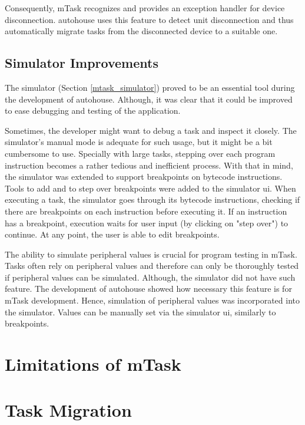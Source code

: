 Consequently, \gls{mTask} recognizes and provides an exception handler for device disconnection. \gls{autohouse} uses this feature to detect unit disconnection and thus automatically migrate tasks from the disconnected device to a suitable one.

\subsection{Simulator Improvements}\label{sec:sim_improv}

The simulator (Section \ref{mtask_simulator}) proved to be an essential tool during the development of \gls{autohouse}. Although, it was clear that it could be improved to ease debugging and testing of the application. 

Sometimes, the developer might want to debug a task and inspect it closely. The simulator's manual mode is adequate for such usage, but it might be a bit cumbersome to use. Specially with large tasks, stepping over each program instruction becomes a rather tedious and inefficient process. With that in mind, the simulator was extended to support breakpoints on bytecode instructions. Tools to add and to step over breakpoints were added to the simulator \acs{ui}. When executing a task, the simulator goes through its bytecode instructions, checking if there are breakpoints on each instruction before executing it. If an instruction has a breakpoint, execution waits for user input (by clicking on "step over") to continue. At any point, the user is able to edit breakpoints. 

The ability to simulate peripheral values is crucial for program testing in \gls{mTask}. Tasks often rely on peripheral values and therefore can only be thoroughly tested if peripheral values can be simulated. Although, the simulator did not have such feature. The development of \gls{autohouse} showed how necessary this feature is for \gls{mTask} development. Hence, simulation of peripheral values was incorporated into the simulator. Values can be manually set via the simulator \acs{ui}, similarly to breakpoints. 

\section{Limitations of mTask}\label{sec:limitations}

\section{Task Migration}\label{sec:task_migration}

